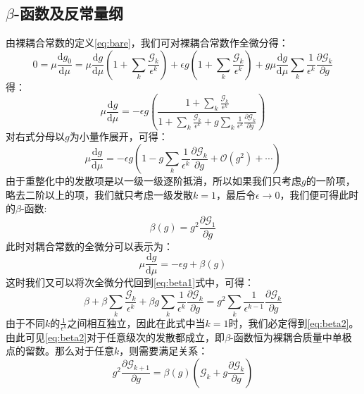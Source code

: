 \subsection{$\beta$-函数及反常量纲}
由裸耦合常数的定义\eqref{eq:bare}，我们可对裸耦合常数作全微分得：
\begin{equation}
0=\mu\frac{\mathrm{d} g_0}{\mathrm{d}\mu}=\mu\frac{\mathrm{d} g}{\mathrm{d}\mu}\left(1+\sum_k\frac{\mathscr{G}_k}{\epsilon^k}\right)+\epsilon g\left(1+\sum_k\frac{\mathscr{G}_k}{\epsilon^k}\right)+g\mu\frac{\mathrm{d} g}{\mathrm{d}\mu}\sum_k\frac{1}{\epsilon^k}\frac{\partial\mathscr{G}_k}{\partial g}
\label{eq:beta1}
\end{equation}
得：
\begin{equation}
\mu\frac{\mathrm{d} g}{\mathrm{d}\mu}=-\epsilon g\left(\frac{1+\sum_k\frac{\mathscr{G}_k}{\epsilon^k}}{1+\sum_k\frac{\mathscr{G}_k}{\epsilon^k}+g\sum_k\frac{1}{\epsilon^k}\frac{\partial\mathscr{G}_k}{\partial g}}\right)
\end{equation}
对右式分母以$g$为小量作展开，可得：
\begin{equation}
\mu\frac{\mathrm{d} g}{\mathrm{d}\mu}=-\epsilon g\left(1-g\sum_k\frac{1}{\epsilon^k}\frac{\partial\mathscr{G}_k}{\partial g}+\mathcal{O}(g^2)+\cdots\right)
\end{equation}
由于重整化中的发散项是以一级一级逐阶抵消，所以如果我们只考虑$g$的一阶项，略去二阶以上的项，我们就只考虑一级发散$k=1$，最后令$\epsilon\rightarrow0$，我们便可得此时的$\beta$-函数:
\begin{equation}
\beta(g)=g^2\frac{\partial\mathscr{G}_1}{\partial g}\label{eq:beta2}
\end{equation}
此时对耦合常数的全微分可以表示为：
\begin{equation}
\mu\frac{\mathrm{d} g}{\mathrm{d}\mu}=-\epsilon g+\beta(g)\label{eq:beta3}
\end{equation}
这时我们又可以将次全微分代回到\eqref{eq:beta1}式中，可得：
\begin{equation}
\beta+\beta\sum_k\frac{\mathscr{G}_k}{\epsilon^k}+\beta g\sum_k\frac{1}{\epsilon^k}\frac{\partial\mathscr{G}_k}{\partial g}=g^2\sum_k\frac{1}{\epsilon^{k-1}}\frac{\partial\mathscr{G}_k}{\partial g}
\end{equation}
由于不同$k$的\(\frac{1}{\epsilon^k}\)之间相互独立，因此在此式中当$k=1$时，我们必定得到\eqref{eq:beta2}。由此可见\eqref{eq:beta2}对于任意级次的发散都成立，即$\beta$-函数恒为裸耦合质量中单极点的留数。那么对于任意$k$，则需要满足关系：
\begin{equation}
g^2\frac{\partial\mathscr{G}_{k+1}}{\partial g}=\beta(g)\left(\mathscr{G}_k+g\frac{\partial\mathscr{G}_k}{\partial g}\right)
\end{equation}

